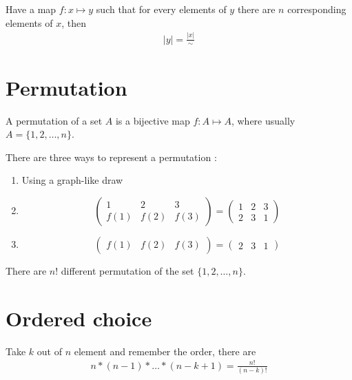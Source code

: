 \documentclass[a4paper,11pt]{report}
\begin{document}
Have a map $f : x \mapsto y$ such that for every elements of $y$ there are $n$
corresponding elements of $x$, then
\begin{gather}
  |y| = \frac{|x|}{\sim}
\end{gather}

\section{Permutation}

A permutation of a set $A$ is a bijective map $f: A \mapsto A$, where usually $A
= \{1,2,\dots,n\}$.

There are three ways to represent a permutation :

\begin{enumerate}
\item Using a graph-like draw
  \usetikzlibrary{graphs,graphs.standard}
\item
  \[
    \begin{pmatrix}
      1 & 2 & 3 \\
      f(1) & f(2) & f(3)
    \end{pmatrix}
    =
    \begin{pmatrix}
      1 & 2 & 3 \\
      2 & 3 & 1
    \end{pmatrix}
  \]
\item
  \[
    \begin{pmatrix}
      f(1) & f(2) & f(3)
    \end{pmatrix}
    =
    \begin{pmatrix}
      2 & 3 & 1
    \end{pmatrix}
  \]
\end{enumerate}

There are $n!$ different permutation of the set $\{1,2,\dots,n\}$.

\section{Ordered choice}

Take $k$ out of $n$ element and remember the order, there are
\begin{gather}
  n * (n-1) * \dots * (n - k + 1) = \frac{n!}{(n-k)!}
\end{gather}
\end{document}
